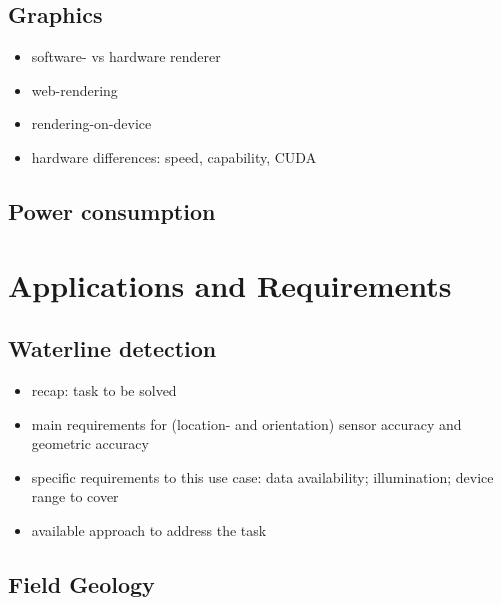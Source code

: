 \documentclass[review]{elsarticle}
\begin{document}
\subsection{Graphics}

\begin{itemize}
\item software- vs hardware renderer
\item web-rendering
\item rendering-on-device
\item hardware differences: speed, capability, CUDA
\end{itemize}

%

\subsection{Power consumption}



\section{Applications and Requirements}
\label{sec:applications}

\subsection{Waterline detection}

\begin{itemize}
\item recap: task to be solved
\item main requirements for (location- and orientation) sensor accuracy and geometric accuracy
\item specific requirements to this use case: data availability; illumination; device range to cover
\item available approach to address the task
\end{itemize}

\subsection{Field Geology}
\end{document}
